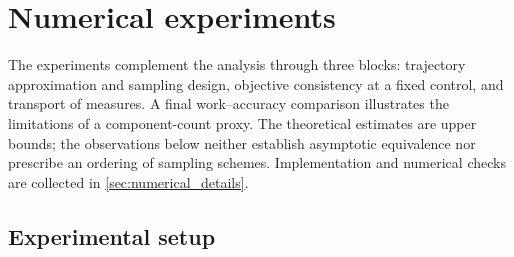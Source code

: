 
\section{Numerical experiments}\label{sec:numerical_results}

The experiments complement the analysis through three blocks: trajectory approximation and sampling design, objective consistency at a fixed control, and transport of measures. A final work--accuracy comparison illustrates the limitations of a component-count proxy. The theoretical estimates are upper bounds; the observations below neither establish asymptotic equivalence nor prescribe an ordering of sampling schemes. Implementation and numerical checks are collected in \cref{sec:numerical_details}.

\subsection{Experimental setup}\label{subsec:num_setup}

